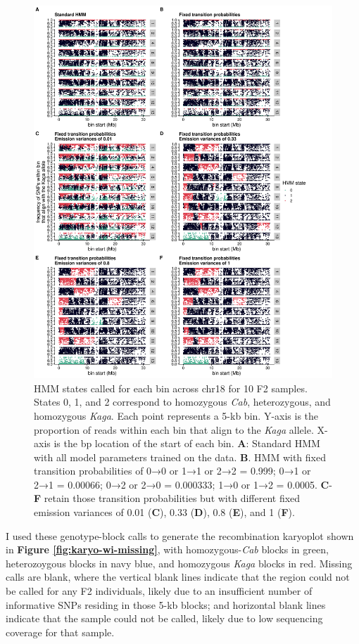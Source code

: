 \documentclass[
]{book}
\begin{document}
\begin{figure}
\includegraphics[width=1\linewidth]{figs/somites/scatter_collage} \caption{HMM states called for each bin across chr18 for 10 F2 samples. States 0, 1, and 2 correspond to homozygous \emph{Cab}, heterozygous, and homozygous \emph{Kaga}. Each point represents a 5-kb bin. Y-axis is the proportion of reads within each bin that align to the \emph{Kaga} allele. X-axis is the bp location of the start of each bin. \textbf{A}: Standard HMM with all model parameters trained on the data. \textbf{B}. HMM with fixed transition probabilities of 0→0 or 1→1 or 2→2 = 0.999; 0→1 or 2→1 = 0.00066; 0→2 or 2→0 = 0.000333; 1→0 or 1→2 = 0.0005. \textbf{C}-\textbf{F} retain those transition probabilities but with different fixed emission variances of 0.01 (\textbf{C}), 0.33 (\textbf{D}), 0.8 (\textbf{E}), and 1 (\textbf{F}).}\label{fig:hmm-scat}
\end{figure}

I used these genotype-block calls to generate the recombination karyoplot shown in \textbf{Figure \ref{fig:karyo-wi-missing}}, with homozygous-\emph{Cab} blocks in green, heterozoygous blocks in navy blue, and homozygous \emph{Kaga} blocks in red. Missing calls are blank, where the vertical blank lines indicate that the region could not be called for any F2 individuals, likely due to an insufficient number of informative SNPs residing in those 5-kb blocks; and horizontal blank lines indicate that the sample could not be called, likely due to low sequencing coverage for that sample.
\end{document}
